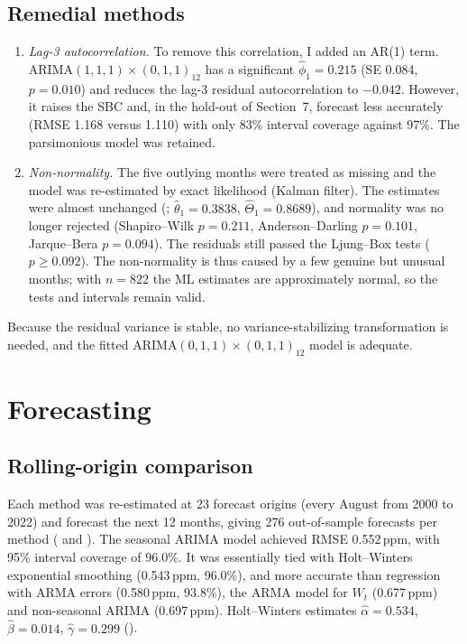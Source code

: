 \documentclass[11pt,letterpaper]{article}
\newcommand{\ppm}{\,ppm}
\begin{document}
\subsection{Remedial methods}
\begin{enumerate}[label=(\roman*)]
  \item \emph{Lag-3 autocorrelation.} To remove this correlation, I added an AR(1) term. ARIMA$(1,1,1)\times(0,1,1)_{12}$ has a significant $\hat\phi_1 = 0.215$ (SE 0.084, $p=0.010$) and reduces the lag-3 residual autocorrelation to $-0.042$. However, it raises the SBC and, in the hold-out of Section~7, forecast less accurately (RMSE 1.168 versus 1.110) with only 83\% interval coverage against 97\%. The parsimonious model was retained.
  \item \emph{Non-normality.} The five outlying months were treated as missing and the model was re-estimated by exact likelihood (Kalman filter). The estimates were almost unchanged (; $\hat\theta_1 = 0.3838$, $\hat\Theta_1 = 0.8689$), and normality was no longer rejected (Shapiro--Wilk $p=0.211$, Anderson--Darling $p=0.101$, Jarque--Bera $p=0.094$). The residuals still passed the Ljung--Box tests ($p \ge 0.092$). The non-normality is thus caused by a few genuine but unusual months; with $n=822$ the ML estimates are approximately normal, so the tests and intervals remain valid.
\end{enumerate}
Because the residual variance is stable, no variance-stabilizing transformation is needed, and the fitted ARIMA$(0,1,1)\times(0,1,1)_{12}$ model is adequate.

\section{Forecasting}
\subsection{Rolling-origin comparison}
Each method was re-estimated at 23 forecast origins (every August from 2000 to 2022) and forecast the next 12 months, giving 276 out-of-sample forecasts per method ( and ). The seasonal ARIMA model achieved RMSE 0.552\ppm, with 95\% interval coverage of 96.0\%. It was essentially tied with Holt--Winters exponential smoothing \citep{winters1960} (0.543\ppm, 96.0\%), and more accurate than regression with ARMA errors (0.580\ppm, 93.8\%), the ARMA model for $W_t$ (0.677\ppm) and non-seasonal ARIMA (0.697\ppm). Holt--Winters estimates $\hat\alpha = 0.534$, $\hat\beta = 0.014$, $\hat\gamma = 0.299$ ().
\end{document}
